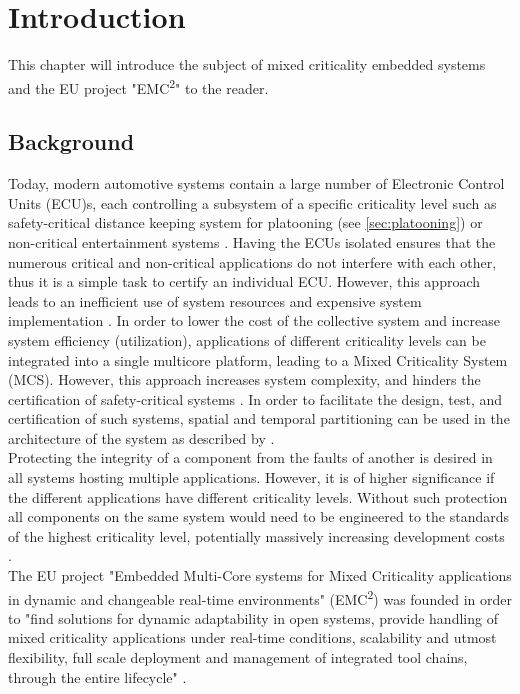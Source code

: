 \chapter{Introduction}
\label{sec:introduction}
This chapter will introduce the subject of mixed criticality embedded systems and the EU project "EMC\textsuperscript{2}" to the reader.

\section{Background}
Today, modern automotive systems contain a large number of Electronic Control Units (ECU)s, each controlling a subsystem of a specific criticality level such as safety-critical distance keeping system for platooning (see \ref{sec:platooning}) or non-critical entertainment systems \cite{weber2015}. Having the ECUs isolated ensures that the numerous critical and non-critical applications do not interfere with each other, thus it is a simple task to certify an individual ECU. However, this approach leads to an inefficient use of system resources and expensive system implementation \cite{burns2016}. In order to lower the cost of the collective system and increase system efficiency (utilization), applications of different criticality levels can be integrated into a single multicore platform, leading to a Mixed Criticality System (MCS). However, this approach increases system complexity, and hinders the certification of safety-critical systems \cite{zaki2016}. %
In order to facilitate the design, test, and certification of such systems, spatial and temporal partitioning can be used in the architecture of the system as described by \cite{zaki2016}.\\

Protecting the integrity of a component from the faults of another is desired in all systems hosting multiple applications. However, it is of higher significance if the different applications have different criticality levels. Without such protection all components on the same system would need to be engineered to the standards of the highest criticality level, potentially massively increasing development costs \cite{burns2016}.\\

The EU project "Embedded Multi-Core systems for Mixed Criticality applications in dynamic and changeable real-time environments" (EMC\textsuperscript{2}) was founded in order to "find solutions for dynamic adaptability in open systems, provide handling of mixed criticality applications under real-time conditions, scalability and utmost flexibility, full scale deployment and management of integrated tool chains, through the entire lifecycle" \cite{weber2015}. 

